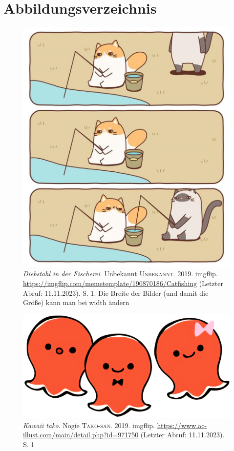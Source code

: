 \newpage

\section{Abbildungsverzeichnis}

\begin{figure}[ht]
	\centering
	\includegraphics[width=.9\linewidth]{pictures/cat.png}
	\caption{\textsl{Diebstahl in der Fischerei}.
    Unbekannt \textsc{Unbekannt}. 2019. imgflip.  \url{https://imgflip.com/memetemplate/190870186/Catfishing} (Letzter Abruf: 11.11.2023). S. 1. Die Breite der Bilder (und damit die Größe) kann man bei width ändern}
	\label{fig:Diebstahl in der Fischerei}
\end{figure}

\begin{figure}[ht]
	\centering
	\includegraphics[width=\linewidth]{pictures/tako.png}
	\caption{\textsl{Kawaii tako}.
    Nogie \textsc{Tako-san}. 2019. imgflip. 
    \url{https://www.ac-illust.com/main/detail.php?id=971750} (Letzter Abruf: 11.11.2023). S. 1}
	\label{fig:Kawaii Tako}
\end{figure}
